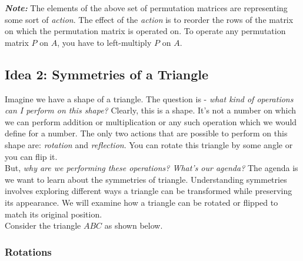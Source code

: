 \textit{\textbf{Note:}} The elements of the above set of permutation matrices are representing some sort of \textit{action}. The effect of the \textit{action} is to reorder the rows of the matrix on which the permutation matrix is operated on. To operate any permutation matrix $P$ on $A$, you have to left-multiply $P$ on $A$. 

\subsection{Idea 2: Symmetries of a Triangle}

Imagine we have a shape of a triangle. The question is - \textit{what kind of operations can I perform on this shape?} Clearly, this is a shape. It's not a number on which we can perform addition or multiplication or any such operation which we would define for a number. The only two actions that are possible to perform on this shape are: \textit{rotation} and \textit{reflection}. You can rotate this triangle by some angle or you can flip it. \\

But, \textit{why are we performing these operations? What's our agenda?} The agenda is we want to learn about the symmetries of triangle. Understanding  symmetries involves exploring different ways a triangle can be transformed while preserving its appearance. We will examine how a triangle can be rotated or flipped to match its original position. \\

Consider the triangle \( ABC \) as shown below.

\begin{center}
\end{center}

\subsubsection{Rotations}

